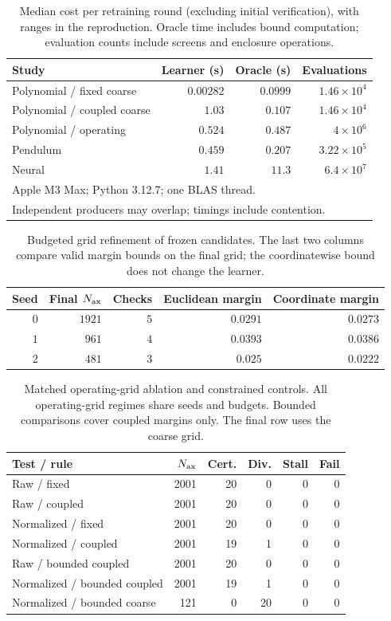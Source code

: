 \begin{table}[t]\centering\caption{Median cost per retraining round (excluding initial verification), with ranges in the reproduction. Oracle time includes bound computation; evaluation counts include screens and enclosure operations.}\label{tab:timings}
\small\begin{tabular}{lrrr}\hline Study & Learner (s) & Oracle (s) & Evaluations\\\hline
Polynomial / fixed coarse & $0.00282$ & $0.0999$ & $1.46 \times 10^{4}$\\
Polynomial / coupled coarse & $1.03$ & $0.107$ & $1.46 \times 10^{4}$\\
Polynomial / operating & $0.524$ & $0.487$ & $4 \times 10^{6}$\\
Pendulum & $0.459$ & $0.207$ & $3.22 \times 10^{5}$\\
Neural & $1.41$ & $11.3$ & $6.4 \times 10^{7}$\\
\hline\multicolumn{4}{l}{\footnotesize Apple M3 Max; Python 3.12.7; one BLAS thread.}\\
\multicolumn{4}{l}{\footnotesize Independent producers may overlap; timings include contention.}\\
\hline\end{tabular}\end{table}
\begin{table}[t]\centering\caption{Budgeted grid refinement of frozen candidates. The last two columns compare valid margin bounds on the final grid; the coordinatewise bound does not change the learner.}\label{tab:refinement}
\small\begin{tabular}{rrrrr}\hline Seed & Final $N_{\rm ax}$ & Checks & Euclidean margin & Coordinate margin\\\hline
$0$ & $1921$ & $5$ & $0.0291$ & $0.0273$\\
$1$ & $961$ & $4$ & $0.0393$ & $0.0386$\\
$2$ & $481$ & $3$ & $0.025$ & $0.0222$\\
\hline\end{tabular}\end{table}
\begin{table}[t]\centering\caption{Matched operating-grid ablation and constrained controls. All operating-grid regimes share seeds and budgets. Bounded comparisons cover coupled margins only. The final row uses the coarse grid.}\label{tab:ablation}
\small\begin{tabular}{lrrrrr}\hline Test / rule & $N_{\rm ax}$ & Cert. & Div. & Stall & Fail\\\hline
Raw / fixed & 2001 & 20 & 0 & 0 & 0\\
Raw / coupled & 2001 & 20 & 0 & 0 & 0\\
Normalized / fixed & 2001 & 20 & 0 & 0 & 0\\
Normalized / coupled & 2001 & 19 & 1 & 0 & 0\\
Raw / bounded coupled & 2001 & 20 & 0 & 0 & 0\\
Normalized / bounded coupled & 2001 & 19 & 1 & 0 & 0\\
Normalized / bounded coarse & 121 & 0 & 20 & 0 & 0\\
\hline\end{tabular}\end{table}
